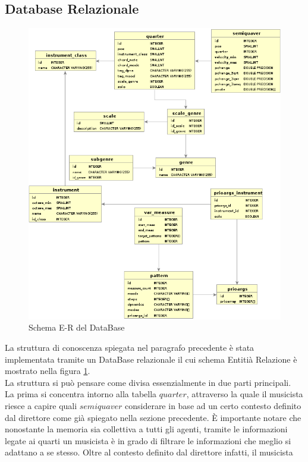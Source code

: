 \subsection{Database Relazionale}
\begin{figure}[H]
\centering
\label{figure-db}
\includegraphics[scale=0.7]{img/db.png}
\caption{Schema E-R del DataBase}
\end{figure}
La struttura di conoscenza spiegata nel paragrafo precedente è stata implementata
tramite un DataBase relazionale il cui schema Entitià Relazione è mostrato nella figura
\ref{figure-db}.\\
La struttura si può pensare come divisa essenzialmente in due parti principali.\\ 
La prima si concentra intorno alla tabella $quarter$, attraverso la quale il musicista
riesce a capire quali $semiquaver$ considerare in base ad un certo contesto definito
dal direttore come già spiegato nella sezione precedente. È importante notare che 
nonostante la memoria sia collettiva a tutti gli agenti, tramite le informazioni 
legate ai quarti un musicista è in grado di filtrare le informazioni che meglio si
adattano a se stesso. Oltre al contesto definito dal direttore infatti, il musicista
